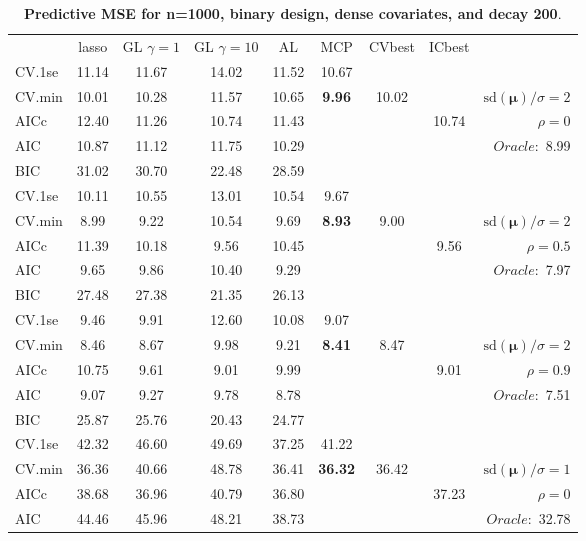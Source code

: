 \begin{table}\vspace{-.5cm}
\caption[l]{ { \bf Predictive MSE for n=1000, binary design, 
dense covariates, and  decay  200}.}
\vspace{-.5cm}
\footnotesize{}
\begin{center}
\begin{tabular}{l*{7}{c}|r}
 & lasso & GL $\gamma=1$ & GL $\gamma=10$ & AL & MCP  & CVbest & ICbest  \\
\cline{1-9}
CV.1se & 11.14 & 11.67 & 14.02 & 11.52 & 10.67 & & & \\
CV.min & 10.01 & 10.28 & 11.57 & 10.65 & {\bf 9.96} & 10.02 & & $\mathrm{sd}(\mathbf{\mu})/\sigma=2$ \\
AICc & 12.40 & 11.26 & 10.74 & 11.43 & & & 10.74 &  $\rho=0$ \\
AIC & 10.87 & 11.12 & 11.75 & 10.29 & & & &  \multirow{2}{*}{$Oracle: $ 8.99} \\
BIC & 31.02 & 30.70 & 22.48 & 28.59 & & & &  \\
 \hline 
CV.1se & 10.11 & 10.55 & 13.01 & 10.54 & 9.67 & & & \\
CV.min & 8.99 & 9.22 & 10.54 & 9.69 & {\bf 8.93} & 9.00 & & $\mathrm{sd}(\mathbf{\mu})/\sigma=2$ \\
AICc & 11.39 & 10.18 & 9.56 & 10.45 & & & 9.56 &  $\rho=0.5$ \\
AIC & 9.65 & 9.86 & 10.40 & 9.29 & & & &  \multirow{2}{*}{$Oracle: $ 7.97} \\
BIC & 27.48 & 27.38 & 21.35 & 26.13 & & & &  \\
 \hline 
CV.1se & 9.46 & 9.91 & 12.60 & 10.08 & 9.07 & & & \\
CV.min & 8.46 & 8.67 & 9.98 & 9.21 & {\bf 8.41} & 8.47 & & $\mathrm{sd}(\mathbf{\mu})/\sigma=2$ \\
AICc & 10.75 & 9.61 & 9.01 & 9.99 & & & 9.01 &  $\rho=0.9$ \\
AIC & 9.07 & 9.27 & 9.78 & 8.78 & & & &  \multirow{2}{*}{$Oracle: $ 7.51} \\
BIC & 25.87 & 25.76 & 20.43 & 24.77 & & & &  \\
 \hline 
CV.1se & 42.32 & 46.60 & 49.69 & 37.25 & 41.22 & & & \\
CV.min & 36.36 & 40.66 & 48.78 & 36.41 & {\bf 36.32} & 36.42 & & $\mathrm{sd}(\mathbf{\mu})/\sigma=1$ \\
AICc & 38.68 & 36.96 & 40.79 & 36.80 & & & 37.23 &  $\rho=0$ \\
AIC & 44.46 & 45.96 & 48.21 & 38.73 & & & &  \multirow{2}{*}{$Oracle: $ 32.78} \\

\end{tabular}
\end{center}
\end{table}

